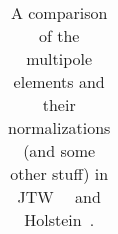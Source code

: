\begin{table}[h!!!!t]
\begin{center}
\begin{tabular}{ | l | l | l | p{2.35in} | }
		\\  \hline
	\end{tabular}
	\end{center}
	\caption[Notation Guide]{A comparison of the multipole elements and their normalizations (and some other stuff) in JTW~\cite{jtw}~\cite{jtw_coulomb} and Holstein~\cite{holstein}.}
	\label{table:compare_notation_multipoles}
\end{table}
\renewcommand{\arraystretch}{1}
%
%
%
%

